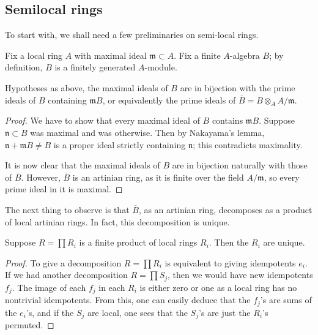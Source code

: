 \subsection{Semilocal rings}

To start with, we shall need a few preliminaries on semi-local rings.

Fix a local ring $A$ with maximal ideal $\mathfrak{m} \subset A$.
Fix a finite $A$-algebra $B$; by definition, $B $ is a finitely
generated $A$-module.

\begin{proposition} 
Hypotheses as above, the maximal ideals of $B$ are in bijection with
the prime ideals of $B $ containing $\mathfrak{m} B$, or equivalently
the prime ideals of $\overline{B} = B \otimes_A A/\mathfrak{m}$.
\end{proposition}

\begin{proof} 
We have to show that every maximal ideal of $B$ contains $\mathfrak{m}
B$. Suppose $\mathfrak{n} \subset B$ was maximal and was otherwise.
Then by Nakayama's lemma, $\mathfrak{n} + \mathfrak{m} B \neq B$ is a
proper ideal strictly containing $\mathfrak{n}$; this contradicts
maximality.

It is now clear that the maximal ideals of $B$ are in bijection
naturally with those of $\overline{B}$. 
However, $\overline{B}$ is an artinian ring, as it is finite over the
field $A/\mathfrak{m}$, so every prime ideal in it is maximal.
\end{proof}



The next thing to observe is that $\overline{B}$, as an artinian ring,
decomposes  as a product of local artinian rings.
In fact, this decomposition is unique.

\begin{proposition} 
Suppose $R = \prod R_i$ is a finite product of local rings $R_i$. Then
the $R_i$ are unique.
\end{proposition}
\begin{proof} 
To give a decomposition $R = \prod R_i$ is equivalent to giving
idempotents $e_i$. If we had another decomposition $R = \prod S_j$,
then we would have new idempotents $f_j$. The image of each $f_j$ in
each $R_i$ is either zero or one as a local ring has no nontrivial
idempotents. From this, one can easily deduce that the $f_j$'s are
sums of the $e_i$'s, and if the $S_j$ are local, one sees that the
$S_j$'s are just the $R_i$'s permuted. 
\end{proof}

